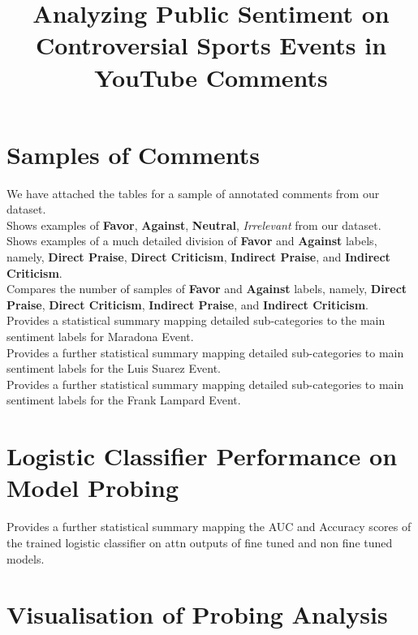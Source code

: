 \documentclass{article}
\title{Analyzing Public Sentiment on Controversial Sports Events in YouTube Comments}
\date{}
\begin{document}
\maketitle


\section{Samples of Comments}

We have attached the tables for a sample of annotated comments from our dataset.
\\
 Shows examples of \textbf{Favor}, \textbf{Against}, \textbf{Neutral}, \textit{Irrelevant} from our dataset.
\\
 Shows examples of a much detailed division of \textbf{Favor} and \textbf{Against} labels, namely, \textbf{Direct Praise}, \textbf{Direct Criticism}, \textbf{Indirect Praise}, and \textbf{Indirect Criticism}.
\\
 Compares the number of samples of \textbf{Favor} and \textbf{Against} labels, namely, \textbf{Direct Praise}, \textbf{Direct Criticism}, \textbf{Indirect Praise}, and \textbf{Indirect Criticism}.
\\
 Provides a statistical summary mapping detailed sub-categories to the main sentiment labels for Maradona Event.
\\
 Provides a further statistical summary mapping detailed sub-categories to main sentiment labels for the Luis Suarez Event.
\\
 Provides a further statistical summary mapping detailed sub-categories to main sentiment labels for the Frank Lampard Event.

\section{Logistic Classifier Performance on Model Probing}
 Provides a further statistical summary mapping the AUC and Accuracy scores of the trained logistic classifier on attn outputs of fine tuned and non fine tuned models.


\section{Visualisation of Probing Analysis}
\end{document}
